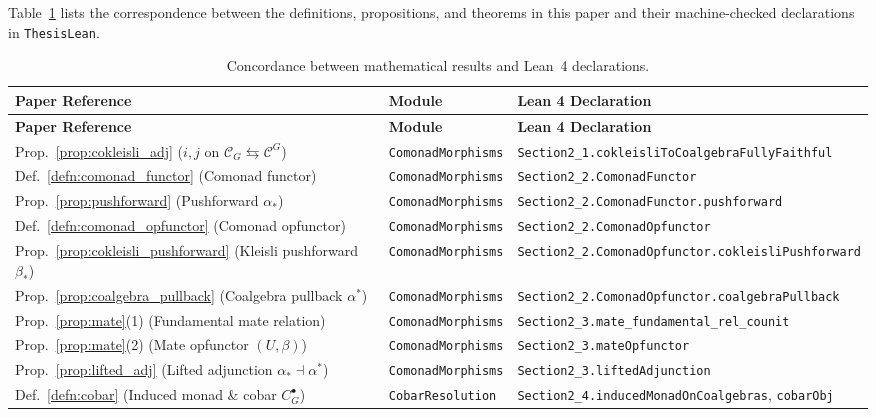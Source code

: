 \documentclass[11pt,reqno]{amsart}
\theoremstyle{plain}
\theoremstyle{definition}
\begin{document}
Table~\ref{tab:concordance} lists the correspondence between the definitions, propositions, and theorems in this paper and their machine-checked declarations in \texttt{ThesisLean}.

{\footnotesize
\begin{longtable}{@{}p{}p{}p{}@{}}
\caption{Concordance between mathematical results and Lean~4 declarations.}\label{tab:concordance}\\
\toprule
\textbf{Paper Reference} & \textbf{Module} & \textbf{Lean 4 Declaration} \\
\midrule
\endfirsthead
\toprule
\textbf{Paper Reference} & \textbf{Module} & \textbf{Lean 4 Declaration} \\
\midrule
\endhead
\bottomrule
\endfoot
Prop.~\ref{prop:cokleisli_adj} ($i, j$ on $\mathcal{C}_G \leftrightarrows \mathcal{C}^G$) & \texttt{ComonadMorphisms} & \texttt{Section2\_1.cokleisliToCoalgebraFullyFaithful} \\
Def.~\ref{defn:comonad_functor} (Comonad functor) & \texttt{ComonadMorphisms} & \texttt{Section2\_2.ComonadFunctor} \\
Prop.~\ref{prop:pushforward} (Pushforward $\alpha_*$) & \texttt{ComonadMorphisms} & \texttt{Section2\_2.ComonadFunctor.pushforward} \\
Def.~\ref{defn:comonad_opfunctor} (Comonad opfunctor) & \texttt{ComonadMorphisms} & \texttt{Section2\_2.ComonadOpfunctor} \\
Prop.~\ref{prop:cokleisli_pushforward} (Kleisli pushforward $\beta_*$) & \texttt{ComonadMorphisms} & \texttt{Section2\_2.ComonadOpfunctor.cokleisliPushforward} \\
Prop.~\ref{prop:coalgebra_pullback} (Coalgebra pullback $\alpha^*$) & \texttt{ComonadMorphisms} & \texttt{Section2\_2.ComonadOpfunctor.coalgebraPullback} \\
Prop.~\ref{prop:mate}(1) (Fundamental mate relation) & \texttt{ComonadMorphisms} & \texttt{Section2\_3.mate\_fundamental\_rel\_counit} \\
Prop.~\ref{prop:mate}(2) (Mate opfunctor $(U,\beta)$) & \texttt{ComonadMorphisms} & \texttt{Section2\_3.mateOpfunctor} \\
Prop.~\ref{prop:lifted_adj} (Lifted adjunction $\alpha_* \dashv \alpha^*$) & \texttt{ComonadMorphisms} & \texttt{Section2\_3.liftedAdjunction} \\
Def.~\ref{defn:cobar} (Induced monad \& cobar $C^{\bullet}_G$) & \texttt{CobarResolution} & \texttt{Section2\_4.inducedMonadOnCoalgebras}, \texttt{cobarObj} \\

\end{longtable}}
\end{document}
